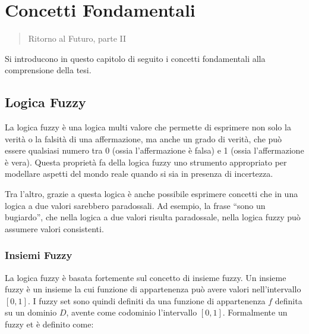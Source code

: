 \chapter{Concetti Fondamentali}
\label{app:concetti}
\thispagestyle{empty}

\begin{quotation}
{\footnotesize
{}
\begin{flushright}
Ritorno al Futuro, parte II
\end{flushright}
}
\end{quotation}
\vspace{0.5cm}

Si introducono in questo capitolo di seguito i concetti fondamentali alla comprensione della tesi.

\section{Logica Fuzzy}
La logica fuzzy è una logica multi valore che permette di esprimere non solo la verità o la falsità di una affermazione, ma anche un grado di verità, che può essere qualsiasi numero tra 0 (ossia l'affermazione è falsa) e 1 (ossia l'affermazione è vera). Questa propriet\`a fa della logica fuzzy uno strumento appropriato per modellare aspetti del mondo reale quando si sia in presenza di incertezza.

Tra l'altro, grazie a questa logica è anche possibile esprimere concetti che in una logica a due valori sarebbero paradossali.
Ad esempio, la frase ``sono un bugiardo'', che nella logica a due valori risulta paradossale, nella logica fuzzy può assumere valori consistenti.

\subsection{Insiemi Fuzzy}
La logica fuzzy è basata fortemente sul concetto di insieme fuzzy. Un insieme fuzzy è un insieme la cui funzione di appartenenza può avere valori nell'intervallo $[0, 1]$.
I fuzzy set sono quindi definiti da una funzione di appartenenza $f$ definita su un dominio $D$, avente come codominio l'intervallo $[0,  1]$.  Formalmente un fuzzy et è definito come:

